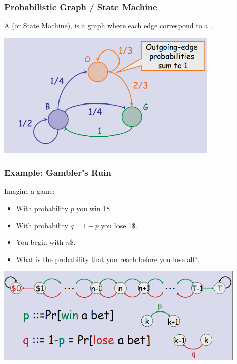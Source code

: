 \documentclass{beamer}
\begin{document}
\begin{frame}
  \frametitle{Probabilistic Graph / State Machine}

  A  (or State Machine), is a graph
  where each edge correspond to a .
  \bigskip
  
  \begin{center}
    \includegraphics[width=0.8\textwidth]{../img/probgraph_example}
  \end{center}
\end{frame}

\begin{frame}
  \frametitle{Example: Gambler's Ruin}

  Imagine a game:
  \begin{itemize}
  \item With probability $p$ you win 1\$.
  \item With probability $q = 1-p$ you lose 1\$.
  \item You begin with $n$\$.
  \item What is the probability that you reach 
      before you \alert{lose all?}.
  \end{itemize}
  
  \begin{center}
    \includegraphics[width=0.9\textwidth]{../img/probgraph_gambler}
  \end{center}
\end{frame}
\end{document}
